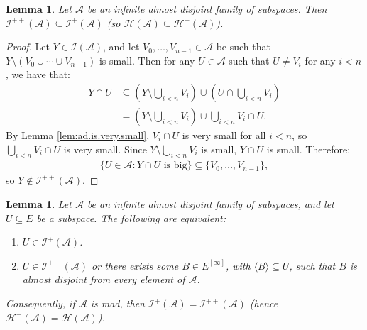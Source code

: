 \documentclass[11pt,reqno]{amsart}
\theoremstyle{plain}
\numberwithin{equation}{section}
\newtheorem{lemma}[theorem]{Lemma}
\theoremstyle{definition}
\renewcommand{\c}[1]{\langle #1 \rangle}
\newcommand{\bb}[1]{\left( #1 \right)}
\newcommand{\cal}{\mathcal}
\newcommand{\A}{\cal{A}}
\renewcommand{\H}{\cal{H}}
\newcommand{\I}{\cal{I}}
\begin{document}
\begin{lemma}
\label{lem:plusplus.in.plus}
    Let $\A$ be an infinite almost disjoint family of subspaces. Then $\I^{++}(\A) \subseteq \I^+(\A)$ (so $\H(\A) \subseteq \H^-(\A)$).
\end{lemma}

\begin{proof}
    Let $Y \in \I(\A)$, and let $V_0,\dots,V_{n-1} \in \A$ be such that $Y \setminus (V_0 \cup \cdots \cup V_{n-1})$ is small. Then for any $U \in \A$ such that $U \neq V_i$ for any $i < n$, we have that:
    \begin{align*}
        Y \cap U &\subseteq \bb{Y \setminus \bigcup_{i<n} V_i} \cup \bb{U \cap \bigcup_{i<n} V_i} \\
        &= \bb{Y \setminus \bigcup_{i<n} V_i} \cup \bigcup_{i<n} V_i \cap U.
    \end{align*}
    By Lemma \ref{lem:ad.is.very.small}, $V_i \cap U$ is very small for all $i < n$, so $\bigcup_{i<n} V_i \cap U$ is very small. Since $Y \setminus \bigcup_{i<n} V_i$ is small, $Y \cap U$ is small. Therefore:
    \begin{align*}
        \{U \in \A : Y \cap U \text{ is big}\} \subseteq \{V_0,\dots,V_{n-1}\},
    \end{align*}
    so $Y \notin \I^{++}(\A)$. 
\end{proof}

\begin{lemma}
\label{lem:I^+(A).dichotomy}
    Let $\A$ be an infinite almost disjoint family of subspaces, and let $U \subseteq E$ be a subspace. The following are equivalent:
    \begin{enumerate}
        \item $U \in \I^+(\A)$.

        \item $U \in \I^{++}(\A)$ or there exists some $B \in E^{[\infty]}$, with $\c{B} \subseteq U$, such that $B$ is almost disjoint from every element of $\A$.
    \end{enumerate}
    Consequently, if $\A$ is mad, then $\I^+(\A) = \I^{++}(\A)$ (hence $\H^-(\A) = \H(\A)$).
\end{lemma}
\end{document}
